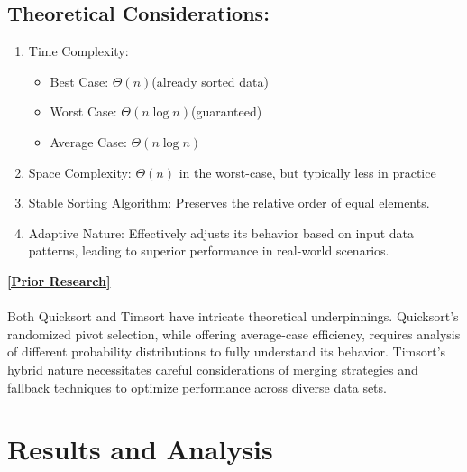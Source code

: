 \documentclass[a4paper, 9pt, twocolumn]{article}
\begin{document}
\subsection*{Theoretical Considerations:}
\begin{enumerate}
  \item Time Complexity:
        \begin{itemize}
          \item Best Case: $\Theta(n)$(already sorted data)
          \item Worst Case: $\Theta(n\log n)$(guaranteed)
          \item Average Case: $\Theta(n\log n)$
        \end{itemize}
  \item Space Complexity: $\Theta(n)$ in the worst-case, but typically less in practice
  \item Stable Sorting Algorithm: Preserves the relative order of equal elements.
  \item Adaptive Nature: Effectively adjusts its behavior based on input data patterns, leading to superior performance in real-world scenarios.
\end{enumerate}
\hyperref[peters2002]{\textbf{[Prior Research]}}\\\\

Both Quicksort and Timsort have intricate theoretical underpinnings. Quicksort's randomized pivot selection, while offering average-case efficiency, requires analysis of different probability distributions to fully understand its behavior. Timsort's hybrid nature necessitates careful considerations of merging strategies and fallback techniques to optimize performance across diverse data sets.


\section{Results and Analysis}
\end{document}
